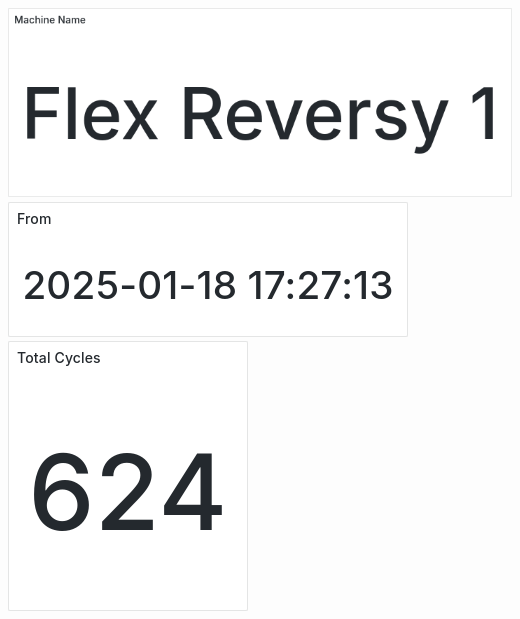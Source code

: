 \documentclass{article}
\begin{document}
\includegraphics[width=\textwidth]{panel_0009-0005.png}
\includegraphics[width=\textwidth]{panel_0009-0014.png}
\includegraphics[width=\textwidth]{panel_0009-0019.png}
\end{document}
